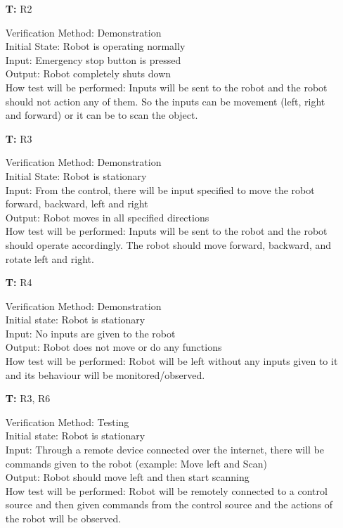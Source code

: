 \documentclass[12pt, titlepage]{article}
\newcounter{tnum} %
\begin{document}
\begin{itemize}
\item[\textbf{T\refstepcounter{tnum}\thetnum:}]{R2\\}

Verification Method: Demonstration\\
Initial State: Robot is operating normally \\ 
Input: Emergency stop button is pressed \\ 
Output: Robot completely shuts down \\
How test will be performed: Inputs will be sent to the robot and the robot should not action any of them. So the inputs can be movement (left, right and forward) or it can be to scan the object.  \\

\item[\textbf{T\refstepcounter{tnum}\thetnum:}]{R3\\}

Verification Method: Demonstration\\
Initial State: Robot is stationary \\
Input: From the control, there will be input specified to move the robot forward, backward, left and right \\
Output: Robot moves in all specified directions \\
How test will be performed: Inputs will be sent to the robot and the robot should operate accordingly. The robot should move forward, backward, and rotate left and right. \\

\item[\textbf{T\refstepcounter{tnum}\thetnum:}]{R4\\}

Verification Method: Demonstration\\
Initial state: Robot is stationary \\
Input: No inputs are given to the robot \\
Output: Robot does not move or do any functions \\
How test will be performed: Robot will be left without any inputs given to it and its behaviour will be monitored/observed. \\


\item[\textbf{T\refstepcounter{tnum}\thetnum:}]{R3, R6\\}
 
Verification Method: Testing	\\
Initial state: Robot is stationary \\
Input: Through a remote device connected over the internet, there will be commands given to the robot (example: Move left and Scan) \\
Output: Robot should move left and then start scanning  \\
How test will be performed: Robot will be remotely connected to a control source and then given commands from the control source and the actions of the robot will be observed. \\


\end{itemize}
\end{document}

